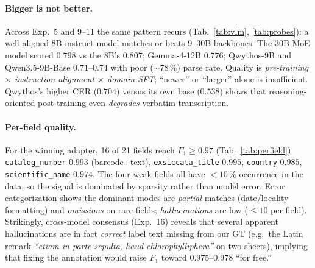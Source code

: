 \paragraph{Bigger is not better.}
Across Exp.~5 and 9--11 the same pattern recurs (Tab.~\ref{tab:vlm},
\ref{tab:probes}): a well-aligned 8B instruct model matches or beats 9--30B
backbones. The 30B MoE model scored $0.798$ vs the 8B's $0.807$; Gemma-4-12B
$0.776$; Qwythos-9B and Qwen3.5-9B-Base $0.71$--$0.74$ with poor ($\sim$78\,\%)
parse rate. Quality is \emph{pre-training $\times$ instruction alignment
$\times$ domain SFT}; ``newer'' or ``larger'' alone is insufficient. Qwythos's
higher CER ($0.704$) versus its own base ($0.538$) shows that reasoning-oriented
post-training even \emph{degrades} verbatim transcription.

\paragraph{Per-field quality.}
For the winning adapter, 16 of 21 fields reach $F_1\ge0.97$
(Tab.~\ref{tab:perfield}): \texttt{catalog\_number} $0.993$ (barcode+text),
\texttt{exsiccata\_title} $0.995$, \texttt{country} $0.985$,
\texttt{scientific\_name} $0.974$. The four weak fields all have $<\!10\,\%$
occurrence in the data, so the signal is dominated by sparsity rather than
model error. Error categorization shows the dominant modes are \emph{partial}
matches (date/locality formatting) and \emph{omissions} on rare fields;
\emph{hallucinations} are low ($\le\!10$ per field). Strikingly, cross-model
consensus (Exp.~16) reveals that several apparent hallucinations are in fact
\emph{correct} label text missing from our GT (e.g.\ the Latin remark
\emph{``etiam in parte sepulta, haud chlorophylliphera''} on two sheets),
implying that fixing the annotation would raise $F_1$ toward $0.975$--$0.978$
``for free.''


